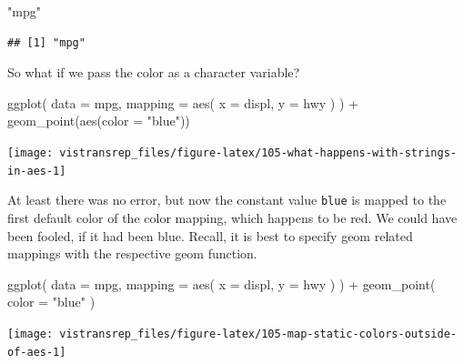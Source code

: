 \documentclass[]{book}
\newenvironment{Shaded}{}{}
\newcommand{\DataTypeTok}[1]{#1}
\newcommand{\KeywordTok}[1]{\textcolor[rgb]{0.00,0.00,1.00}{#1}}
\newcommand{\NormalTok}[1]{#1}
\newcommand{\OperatorTok}[1]{#1}
\newcommand{\StringTok}[1]{\textcolor[rgb]{0.00,0.50,0.50}{#1}}
\begin{document}
\begin{Shaded}
\begin{Highlighting}[]
\StringTok{"mpg"}
\end{Highlighting}
\end{Shaded}

\begin{verbatim}
## [1] "mpg"
\end{verbatim}

So what if we pass the color as a character variable?

\begin{Shaded}
\begin{Highlighting}[]
\KeywordTok{ggplot}\NormalTok{(}
  \DataTypeTok{data =}\NormalTok{ mpg,}
  \DataTypeTok{mapping =} \KeywordTok{aes}\NormalTok{(}
    \DataTypeTok{x =}\NormalTok{ displ,}
    \DataTypeTok{y =}\NormalTok{ hwy}
\NormalTok{  )}
\NormalTok{) }\OperatorTok{+}
\StringTok{  }\KeywordTok{geom_point}\NormalTok{(}\KeywordTok{aes}\NormalTok{(}\DataTypeTok{color =} \StringTok{"blue"}\NormalTok{))}
\end{Highlighting}
\end{Shaded}

\begin{flushright}\texttt{[image: vistransrep\_files/figure-latex/105-what-happens-with-strings-in-aes-1]} \end{flushright}

At least there was no error, but now the constant value \texttt{blue} is mapped to the first default color of the color mapping, which happens to be red.
We could have been fooled, if it had been blue.
Recall, it is best to specify geom related mappings with the respective geom function.

\begin{Shaded}
\begin{Highlighting}[]
\KeywordTok{ggplot}\NormalTok{(}
  \DataTypeTok{data =}\NormalTok{ mpg,}
  \DataTypeTok{mapping =} \KeywordTok{aes}\NormalTok{(}
    \DataTypeTok{x =}\NormalTok{ displ,}
    \DataTypeTok{y =}\NormalTok{ hwy}
\NormalTok{  )}
\NormalTok{) }\OperatorTok{+}
\StringTok{  }\KeywordTok{geom_point}\NormalTok{(}
    \DataTypeTok{color =} \StringTok{"blue"}
\NormalTok{  )}
\end{Highlighting}
\end{Shaded}

\begin{flushright}\texttt{[image: vistransrep\_files/figure-latex/105-map-static-colors-outside-of-aes-1]} \end{flushright}
\end{document}
